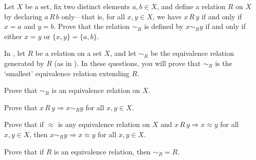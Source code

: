\begin{chapex}
\label{cqEquivalenceRelationGeneratedByRelationEnd}
Let $X$ be a set, fix two distinct elements $a,b \in X$, and define a relation $R$ on $X$ by declaring $a\,R\,b$ only---that is, for all $x,y \in X$, we have $x\,R\,y$ if and only if $x=a$ and $y=b$. Prove that the relation ${\sim}_R$ is defined by $x \sim_R y$ if and only if either $x=y$ or $\{x,y\} = \{a,b\}$.
\end{chapex}

In , let $R$ be a relation on a set $X$, and let $\sim_R$ be the equivalence relation generated by $R$ (as in ). In these questions, you will prove that $\sim_R$ is the `smallest' equivalence relation extending $R$.

\begin{chapex}
\label{cqPropertiesOfEquivalenceRelationGeneratedByRelationBegin}
Prove that ${\sim}_R$ is an equivalence relation on $X$.
\end{chapex}

\begin{chapex}
Prove that $x\,R\,y \Rightarrow x \sim_R y$ for all $x,y \in X$.
\end{chapex}

\begin{chapex}
Prove that if $\approx$ is any equivalence relation on $X$ and $x\,R\,y \Rightarrow x \approx y$ for all $x,y \in X$, then $x \sim_R y \Rightarrow x \approx y$ for all $x,y \in X$.
\end{chapex}

\begin{chapex}
\label{cqPropertiesOfEquivalenceRelationGeneratedByRelationEnd}
Prove that if $R$ is an equivalence relation, then ${\sim_R} = R$.
\end{chapex}